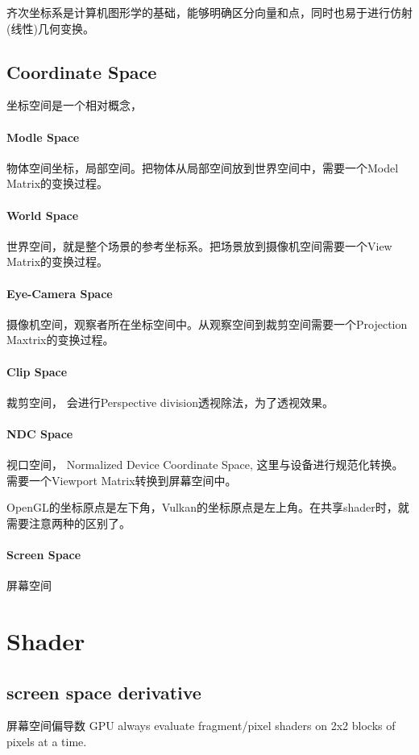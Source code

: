 齐次坐标系是计算机图形学的基础，能够明确区分向量和点，同时也易于进行仿射(线性)几何变换。

\subsection{Coordinate Space}
坐标空间是一个相对概念，

\paragraph{Modle Space}
物体空间坐标，局部空间。把物体从局部空间放到世界空间中，需要一个Model Matrix的变换过程。

\paragraph{World Space}
世界空间，就是整个场景的参考坐标系。把场景放到摄像机空间需要一个View Matrix的变换过程。

\paragraph{Eye-Camera Space}
摄像机空间，观察者所在坐标空间中。从观察空间到裁剪空间需要一个Projection Maxtrix的变换过程。

\paragraph{Clip Space}
裁剪空间，
会进行Perspective division透视除法，为了透视效果。

\paragraph{NDC Space}
视口空间， Normalized Device Coordinate Space, 这里与设备进行规范化转换。
需要一个Viewport Matrix转换到屏幕空间中。

OpenGL的坐标原点是左下角，Vulkan的坐标原点是左上角。在共享shader时，就需要注意两种的区别了。


\paragraph{Screen Space}
屏幕空间


\section{Shader}

\subsection{screen space derivative}
屏幕空间偏导数
GPU always evaluate fragment/pixel shaders on 2x2 blocks of pixels at a time.

